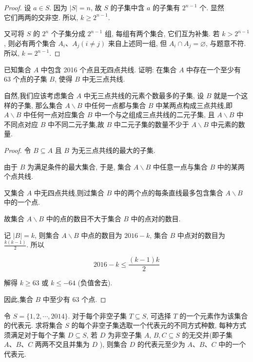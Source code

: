 \begin{proof}
设 $a \in S$. 因为 $|S|=n$, 故 $S$ 的子集中含 $a$ 的子集有 $2^{n-1}$ 个. 显然\\
它们两两的交非空. 所以, $k \geqslant 2^{n-1}$.

又可将 $S$ 的 $2^{n}$ 个子集分成 $2^{n-1}$ 组, 每组有两个集合, 它们互为补集. 若 $k>2^{n-1}$, 则必有两个集合 $A_{i} 、 A_{j}(i \neq j)$ 来自上述同一组, 但 $A_{i} \cap A_{j}=\varnothing$, 与题意不符. 所以, $k=2^{n-1}$.
\end{proof}

\begin{example}
已知集合 $A$ 中包含 2016 个点且无四点共线. 证明: 在集合 $A$ 中存在一个至少有 63 个点的子集 $B$, 使得 $B$ 中无三点共线.
\end{example}

\begin{analysis}
自然,我们应该考虑集合 $A$ 中无三点共线的元素个数最多的子集, 设 $B$ 就是一个这样的子集, 那么集合 $A \backslash B$ 中任何一点都与集合 $B$ 中某两点构成三点共线,即 $A \backslash B$ 中任何一点对应集合 $B$ 中一个与之组成三点共线的二元子集, 且 $A \backslash B$ 中不同点对应 $B$ 中不同二元子集,故 $B$ 中二元子集的数量不少于 $A \backslash B$ 中元素的数量.
\end{analysis}

\begin{proof}
令 $B \subseteq A$ 且 $B$ 为无三点共线的最大的子集.

由于 $B$ 为满足条件的最大集合, 于是, 集合 $A \backslash B$ 中任意一点与集合 $B$ 中的某两个点共线.

又集合 $A$ 中无四点共线,则过集合 $B$ 中的两个点的每条直线最多包含集合 $A \backslash B$ 中的一个点.

故集合 $A \backslash B$ 中的点的数目不大于集合 $B$ 中的点对的数目.

记 $|B|=k$, 则集合 $A \backslash B$ 中点的数目为 $2016-k$, 集合 $B$ 中点对的数目为 $\frac{k(k-1)}{2}$. 所以

$$
2016-k \leqslant \frac{(k-1) k}{2}
$$

解得 $k \geqslant 63$ 或 $k \leqslant-64$ (负值舍去).

因此,集合 $B$ 中至少有 63 个点.
\end{proof}

\begin{example}
令 $S=\{1,2, \cdots, 2014\}$. 对于每个非空子集 $T \subseteq S$, 可选择 $T$ 的一个元素作为该集合的代表元. 求将集合 $S$ 的每个非空子集选取一个代表元的不同方式种数, 每种方式须满足对于每个子集 $D \subseteq S$, 若 $D$ 为非空子集 $A$, $B, C \subseteq S$ 的无交并(即子集 $A 、 B 、 C$ 两两不交且并集为 $D$ ), 则集合 $D$ 的代表元至少为 $A 、 B 、 C$ 中的一个代表元.
\end{example}


